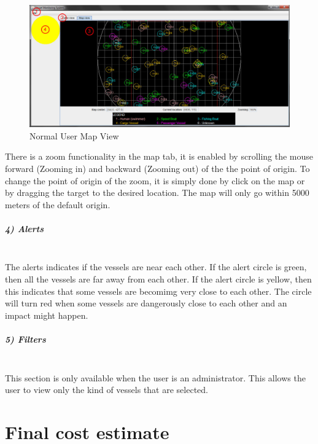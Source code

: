 \documentclass{article}
\begin{document}
	\begin{figure}[!htb]
	\caption{Normal User Map View}
	\centering
	\includegraphics[scale=0.36]{images/userManual3_user.jpg}
	\end{figure}

There is a zoom functionality in the map tab, it is enabled by scrolling the mouse forward (Zooming in) and backward (Zooming out) of the the point of origin. To change the point of origin of the zoom, it is simply done by click on the map or by dragging the target to the desired location. The map will only go within 5000 meters of the default origin.
\pagebreak
\subparagraph{4) Alerts \\ \\}
The alerts indicates if the vessels are near each other. If the alert circle is green, then all the vessels are far away from each other. If the alert circle is yellow, then this indicates that some vessels are becomimg very close to each other. The circle will turn red when some vessels are dangerously close to each other and an impact might happen.

\subparagraph{5) Filters \\ \\}
This section is only available when the user is an administrator. This allows the user to view only the kind of vessels that are selected.

\break

\section{Final cost estimate} %

\end{document}
